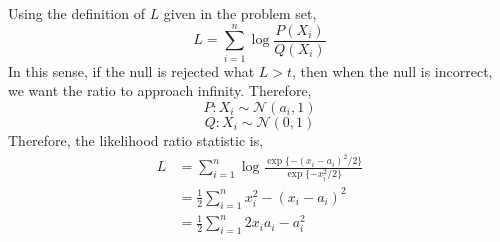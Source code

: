 \documentclass[12pt,twoside]{article}
\begin{document}
\begin{problems}
\newpage

\problem  %

\begin{problemparts}

\problempart  %

Using the definition of $L$ given in the problem set,
$$ L = \sum_{i = 1}^n \log \frac{P(X_i)}{Q(X_i)} $$
In this sense, if the null is rejected what $L > t$, then when the null is
incorrect, we want the ratio to approach infinity. Therefore,
$$ P : X_i \sim \mathcal{N}(a_i, 1) $$
$$ Q : X_i \sim \mathcal{N}(0, 1) $$
Therefore, the likelihood ratio statistic is,
\begin{align*}
    L &= \sum_{i = 1}^n \log \frac{\exp\{-(x_i -
    a_i)^2/2\}}{\exp\{-x_i^2/2\}} \\
    &= \frac{1}{2}\sum_{i = 1}^n x_i^2 - (x_i - a_i)^2 \\
    &= \frac{1}{2}\sum_{i = 1}^n 2 x_i a_i - a_i^2
\end{align*}

\problempart  %

\end{problemparts}

\newpage

\problem  %

\begin{problemparts}

\problempart  %

\problempart  %

\problempart  %

\end{problemparts}

\newpage

\problem  %


\end{problems}
\end{document}
